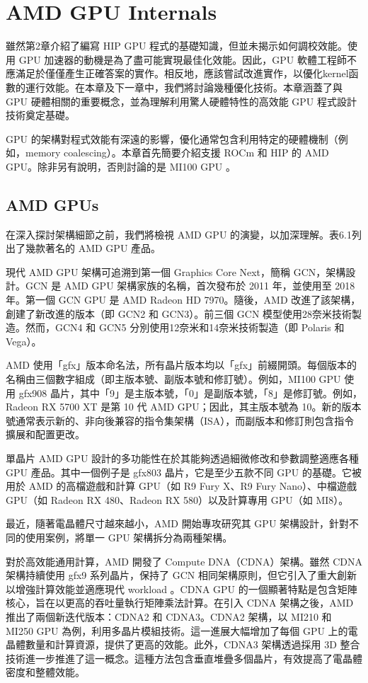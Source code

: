 \chapter{AMD GPU Internals} \label{chap:AMD_GPU_internal}
雖然第2章介紹了編寫 HIP GPU 程式的基礎知識，但並未揭示如何調校效能。使用 GPU 加速器的動機是為了盡可能實現最佳化效能。因此，GPU 軟體工程師不應滿足於僅僅產生正確答案的實作。相反地，應該嘗試改進實作，以優化kernel函數的運行效能。在本章及下一章中，我們將討論幾種優化技術。本章涵蓋了與 GPU 硬體相關的重要概念，並為理解利用驚人硬體特性的高效能 GPU 程式設計技術奠定基礎。

GPU 的架構對程式效能有深遠的影響，優化通常包含利用特定的硬體機制（例如，memory coalescing）。本章首先簡要介紹支援 ROCm 和 HIP 的 AMD GPU。除非另有說明，否則討論的是 MI100 GPU \cite{amd2021cdna2}。

\section{AMD GPUs}
在深入探討架構細節之前，我們將檢視 AMD GPU 的演變，以加深理解。表6.1列出了幾款著名的 AMD GPU 產品。

現代 AMD GPU 架構可追溯到第一個 Graphics Core Next，簡稱 GCN，架構設計。GCN 是 AMD GPU 架構家族的名稱，首次發布於 2011 年，並使用至 2018 年。第一個 GCN GPU 是 AMD Radeon HD 7970。隨後，AMD 改進了該架構，創建了新改進的版本（即 GCN2 和 GCN3）。前三個 GCN 模型使用28奈米技術製造。然而，GCN4 和 GCN5 分別使用12奈米和14奈米技術製造（即 Polaris 和 Vega）。

AMD 使用「gfx」版本命名法，所有晶片版本均以「gfx」前綴開頭。每個版本的名稱由三個數字組成（即主版本號、副版本號和修訂號）。例如，MI100 GPU 使用 gfx908 晶片，其中「9」是主版本號，「0」是副版本號，「8」是修訂號。例如，Radeon RX 5700 XT 是第 10 代 AMD GPU；因此，其主版本號為 10。新的版本號通常表示新的、非向後兼容的指令集架構（ISA），而副版本和修訂則包含指令擴展和配置更改。

單晶片 AMD GPU 設計的多功能性在於其能夠透過細微修改和參數調整適應各種 GPU 產品。其中一個例子是 gfx803 晶片，它是至少五款不同 GPU 的基礎。它被用於 AMD 的高檔遊戲和計算 GPU（如 R9 Fury X、R9 Fury Nano）、中檔遊戲 GPU（如 Radeon RX 480、Radeon RX 580）以及計算專用 GPU（如 MI8）。

最近，隨著電晶體尺寸越來越小，AMD 開始專攻研究其 GPU 架構設計，針對不同的使用案例，將單一 GPU 架構拆分為兩種架構。

對於高效能通用計算，AMD 開發了 Compute DNA（CDNA）架構。雖然 CDNA 架構持續使用 gfx9 系列晶片，保持了 GCN 相同架構原則，但它引入了重大創新以增強計算效能並適應現代 workload 。CDNA GPU 的一個顯著特點是包含矩陣核心，旨在以更高的吞吐量執行矩陣乘法計算。在引入 CDNA 架構之後，AMD 推出了兩個新迭代版本：CDNA2 和 CDNA3。CDNA2 架構，以 MI210 和 MI250 GPU 為例，利用多晶片模組技術。這一進展大幅增加了每個 GPU 上的電晶體數量和計算資源，提供了更高的效能。此外，CDNA3 架構透過採用 3D 整合技術進一步推進了這一概念。這種方法包含垂直堆疊多個晶片，有效提高了電晶體密度和整體效能。

